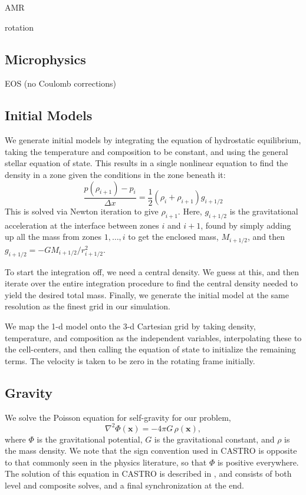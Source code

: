 \documentclass[12pt,preprint]{aastex}
\begin{document}
AMR

rotation


\subsection{Microphysics}

EOS (no Coulomb corrections)



\subsection{Initial Models}


We generate initial models by integrating the equation of hydrostatic
equilibrium, taking the temperature and composition to be constant,
and using the general stellar equation of state.  This results in
a single nonlinear equation to find the density in a zone given the
conditions in the zone beneath it:
\begin{equation}
\frac{p(\rho_{i+1}) - p_i}{\Delta x} = \frac{1}{2} (\rho_i + \rho_{i+1}) g_{i+1/2}
\end{equation}
This is solved via Newton iteration to give $\rho_{i+1}$.  Here, $g_{i+1/2}$
is the gravitational acceleration at the interface between zones $i$ and $i+1$,
found by simply adding up all the mass from zones $1, \ldots, i$ to get the
enclosed mass, $M_{i+1/2}$, and then $g_{i+1/2} = -GM_{i+1/2}/r_{i+1/2}^2$.

To start the integration off, we need a central density.  We guess at
this, and then iterate over the entire integration procedure to find
the central density needed to yield the desired total mass.  Finally,
we generate the initial model at the same resolution as the finest
grid in our simulation.

We map the 1-d model onto the 3-d Cartesian grid by taking density,
temperature, and composition as the independent variables,
interpolating these to the cell-centers, and then calling the equation
of state to initialize the remaining terms.  The velocity is taken to
be zero in the rotating frame initially.

\subsection{Gravity}

We solve the Poisson equation for self-gravity for our problem,
\begin{equation}
  \nabla^2 \Phi(\mathbf{x}) = -4\pi G\, \rho(\mathbf{x}),
\end{equation}
where $\Phi$ is the gravitational potential, $G$ is the gravitational constant, and $\rho$ is the mass density. We note that the sign convention used in CASTRO is opposite to that commonly seen in the physics literature, so that $\Phi$ is positive everywhere. The solution of this equation in CASTRO is described in \cite{castro}, and consists of both level and composite solves, and a final synchronization at the end.
\end{document}
